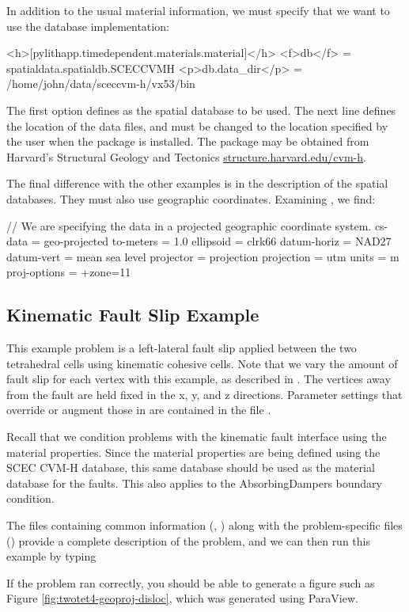 In addition to the usual material information, we must specify that
we want to use the  database implementation:
\begin{cfg}
<h>[pylithapp.timedependent.materials.material]</h>
<f>db</f> = spatialdata.spatialdb.SCECCVMH
<p>db.data_dir</p> = /home/john/data/sceccvm-h/vx53/bin
\end{cfg}
The first  option defines  as the
spatial database to be used. The next line defines the location of the
 data files, and must be changed to the location
specified by the user when the package is installed. The package may
be obtained from Harvard's Structural Geology and Tectonics
\url{structure.harvard.edu/cvm-h}.

The final difference with the other examples is in the description of
the spatial databases. They must also use geographic coordinates.
Examining , we find:
\begin{SimpleIOAscii}
// We are specifying the data in a projected geographic coordinate system.
cs-data = geo-projected {
  to-meters = 1.0
  ellipsoid = clrk66
  datum-horiz = NAD27
  datum-vert = mean sea level
  projector = projection {
    projection = utm
    units = m
    proj-options = +zone=11
  }
}
\end{SimpleIOAscii}

\subsection{Kinematic Fault Slip Example}

This example problem is a left-lateral fault slip applied between
the two tetrahedral cells using kinematic cohesive cells. Note that
we vary the amount of fault slip for each vertex with this example,
as described in 
. The vertices away from the fault
are held fixed in the x, y, and z directions. Parameter settings that
override or augment those in  are contained
in the file .

Recall that we condition problems with the kinematic fault interface
using the material properties. Since the material properties are being
defined using the SCEC CVM-H database, this same database should be
used as the material database for the faults. This also applies to
the AbsorbingDampers boundary condition.

The files containing common information (, )
along with the problem-specific files () provide a complete description of
the problem, and we can then run this example by typing
If the problem ran correctly, you should be able to generate a figure
such as Figure \vref{fig:twotet4-geoproj-disloc}, which was generated
using ParaView.

